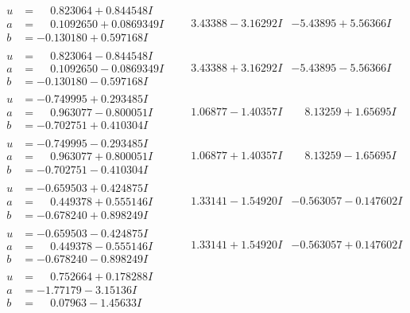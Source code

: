 \documentclass[1p]{elsarticle_modified}
\theoremstyle{definition}
\begin{document}
$$\begin{array}{c|c|c}
\begin{aligned}
u &= \phantom{-}0.823064 + 0.844548 I \\
a &= \phantom{-}0.1092650 + 0.0869349 I \\
b &= -0.130180 + 0.597168 I\end{aligned}
 & \phantom{-}3.43388 - 3.16292 I & -5.43895 + 5.56366 I \\ \hline\begin{aligned}
u &= \phantom{-}0.823064 - 0.844548 I \\
a &= \phantom{-}0.1092650 - 0.0869349 I \\
b &= -0.130180 - 0.597168 I\end{aligned}
 & \phantom{-}3.43388 + 3.16292 I & -5.43895 - 5.56366 I \\ \hline\begin{aligned}
u &= -0.749995 + 0.293485 I \\
a &= \phantom{-}0.963077 - 0.800051 I \\
b &= -0.702751 + 0.410304 I\end{aligned}
 & \phantom{-}1.06877 - 1.40357 I & \phantom{-}8.13259 + 1.65695 I \\ \hline\begin{aligned}
u &= -0.749995 - 0.293485 I \\
a &= \phantom{-}0.963077 + 0.800051 I \\
b &= -0.702751 - 0.410304 I\end{aligned}
 & \phantom{-}1.06877 + 1.40357 I & \phantom{-}8.13259 - 1.65695 I \\ \hline\begin{aligned}
u &= -0.659503 + 0.424875 I \\
a &= \phantom{-}0.449378 + 0.555146 I \\
b &= -0.678240 + 0.898249 I\end{aligned}
 & \phantom{-}1.33141 - 1.54920 I & -0.563057 - 0.147602 I \\ \hline\begin{aligned}
u &= -0.659503 - 0.424875 I \\
a &= \phantom{-}0.449378 - 0.555146 I \\
b &= -0.678240 - 0.898249 I\end{aligned}
 & \phantom{-}1.33141 + 1.54920 I & -0.563057 + 0.147602 I \\ \hline\begin{aligned}
u &= \phantom{-}0.752664 + 0.178288 I \\
a &= -1.77179 - 3.15136 I \\
b &= \phantom{-}0.07963 - 1.45633 I\end{aligned}

\end{array}$$
\end{document}
